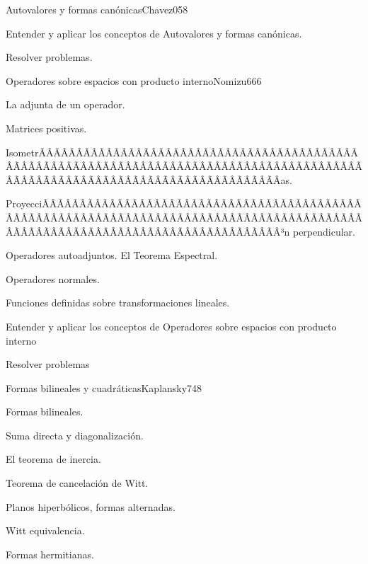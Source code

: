 \begin{sumilla}
\begin{unit}{Autovalores y formas can\'onicas}{Chavez05}{8}
   \begin{objetivos}
         \item  Entender y aplicar los conceptos de Autovalores y formas can\'onicas.
         \item  Resolver problemas.
   \end{objetivos}
\end{unit}

\begin{unit}{Operadores sobre espacios con producto interno}{Nomizu66}{6}
   \begin{topicos}
	\item  La adjunta de un operador.
	\item  Matrices positivas.
	\item  IsometrÃÂÃÂÃÂÃÂÃÂÃÂÃÂÃÂÃÂÃÂÃÂÃÂÃÂÃÂÃÂÃÂÃÂÃÂÃÂÃÂÃÂÃÂÃÂÃÂÃÂÃÂÃÂÃÂÃÂÃÂÃÂÃÂÃÂÃÂÃÂÃÂÃÂÃÂÃÂÃÂÃÂÃÂÃÂÃÂÃÂÃÂÃÂÃÂÃÂÃÂÃÂÃÂÃÂÃÂÃÂÃÂÃÂÃÂÃÂÃÂÃÂÃÂÃÂÃÂ­as.
	\item  ProyecciÃÂÃÂÃÂÃÂÃÂÃÂÃÂÃÂÃÂÃÂÃÂÃÂÃÂÃÂÃÂÃÂÃÂÃÂÃÂÃÂÃÂÃÂÃÂÃÂÃÂÃÂÃÂÃÂÃÂÃÂÃÂÃÂÃÂÃÂÃÂÃÂÃÂÃÂÃÂÃÂÃÂÃÂÃÂÃÂÃÂÃÂÃÂÃÂÃÂÃÂÃÂÃÂÃÂÃÂÃÂÃÂÃÂÃÂÃÂÃÂÃÂÃÂÃÂÃÂ³n perpendicular.
	\item  Operadores autoadjuntos. El Teorema Espectral.
	\item  Operadores normales.
	\item Funciones definidas sobre transformaciones lineales.
   \end{topicos}

   \begin{objetivos}
         \item  Entender y aplicar los conceptos de Operadores sobre espacios con producto interno
         \item  Resolver problemas
   \end{objetivos}
\end{unit}

\begin{unit}{Formas bilineales y cuadr\'aticas}{Kaplansky74}{8}
   \begin{topicos}
	\item Formas bilineales.
	\item Suma directa y diagonalizaci\'on.
	\item El teorema de inercia.
	\item Teorema de cancelaci\'on de Witt.
	\item Planos hiperb\'olicos, formas alternadas.
	\item Witt equivalencia.
	\item Formas hermitianas.
   \end{topicos}


\end{unit}
\end{sumilla}
